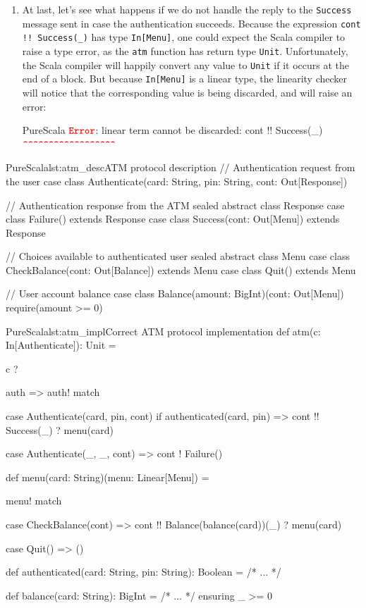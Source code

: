 \documentclass[a4paper,twoside]{article}
\newcommand{\stt}[1]{\texttt{\small{#1}}}
\begin{document}
\begin{enumerate}
\item
At last, let's see what happens if we do not handle the reply to the \stt{Success} message sent in case the authentication succeeds. Because the expression \stt{cont !! Success(\_)} has type \stt{In[Menu]}, one could expect the Scala compiler to raise a type error, as the \stt{atm} function has return type \stt{Unit}. Unfortunately, the Scala compiler will happily convert any value to \stt{Unit} if it occurs at the end of a block. But because \stt{In[Menu]} is a linear type, the linearity checker will notice that the corresponding value is being discarded, and will raise an error:

\begin{ShortCode}{PureScala}
$\texttt{\textbf{\textcolor{Red}{Error}}}$: linear term cannot be discarded: cont !! Success(_)
                                        $\texttt{\textbf{\textcolor{Red}{\textasciicircum\textasciicircum\textasciicircum\textasciicircum\textasciicircum\textasciicircum\textasciicircum\textasciicircum\textasciicircum\textasciicircum\textasciicircum\textasciicircum\textasciicircum\textasciicircum\textasciicircum\textasciicircum\textasciicircum\textasciicircum}}}$
\end{ShortCode}
\end{enumerate}

\begin{Code}{PureScala}{lst:atm_desc}{ATM protocol description}
// Authentication request from the user
case class Authenticate(card: String, pin: String, cont: Out[Response])

// Authentication response from the ATM
sealed abstract class Response
case class Failure()                extends Response
case class Success(cont: Out[Menu]) extends Response

// Choices available to authenticated user
sealed abstract class Menu
case class CheckBalance(cont: Out[Balance]) extends Menu
case class Quit()                           extends Menu

// User account balance
case class Balance(amount: BigInt)(cont: Out[Menu]) {
  require(amount >= 0)
}
\end{Code}

\begin{Code}{PureScala}{lst:atm_impl}{Correct ATM protocol implementation}
def atm(c: In[Authenticate]): Unit = {
  c ? { auth => auth! match {  
    case Authenticate(card, pin, cont) if authenticated(card, pin) =>
      cont !! Success(_) ? menu(card)
  
    case Authenticate(_, _, cont)  =>
      cont ! Failure()
  } }
}

def menu(card: String)(menu: Linear[Menu]) = {
  menu! match {
    case CheckBalance(cont) =>
      cont !! Balance(balance(card))(_) ? menu(card)

    case Quit() => ()
  }
}

def authenticated(card: String, pin: String): Boolean = {
  /* ... */
}

def balance(card: String): BigInt = {
  /* ... */
} ensuring { _ >= 0 }
\end{Code}
\end{document}
